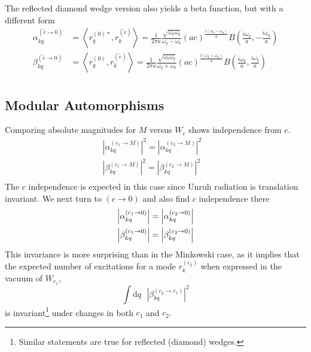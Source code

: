 \documentclass[12pt,a4paper]{article}
\newcommand{\dv}[1]{\mathrm{d} #1 \text{ }}
\begin{document}
The reflected diamond wedge version also yields a beta function, but with a different form
\begin{equation}
  \begin{aligned}
    \alpha^{(\widetilde{c} \rightarrow 0)}_{kq}     &= \left<r_q^{(0)*}, r_k^{(\widetilde{c})} \right> = \frac{1}{2 \pi a}\frac{\sqrt{\omega_k \omega_q}}{\omega_q - \omega_k} (ac)^{\frac{i(\omega_k - \omega_q)}{a}} B\left(\frac{i\omega_k}{a}, -\frac{i\omega_q}{a}\right) \\
    \beta^{(\widetilde{c} \rightarrow 0)}_{kq} &= \left<r_q^{(0)}, r_k^{(\widetilde{c})} \right> = \frac{1}{2 \pi a}\frac{\sqrt{\omega_k \omega_q}}{\omega_q + \omega_k} (ac)^{\frac{i(\omega_k + \omega_q)}{a}} B\left(\frac{i\omega_k}{a}, \frac{i\omega_q}{a}\right) \\
  \end{aligned}
  \label{bogoTC0}
\end{equation}

\subsection{Modular Automorphisms} \label{sec:mod}

Comparing absolute magnitudes for $M$ versus $W_c$ shows independence from $c$.
\begin{equation}
  \begin{array}{cc}
    \left|\alpha_{kq}^{(c_1 \rightarrow M)}\right|^2 = \left|\alpha_{kq}^{(c_2 \rightarrow M)}\right|^2 & \\
    \left|\beta_{kq}^{(c_1 \rightarrow M)}\right|^2 = \left|\beta_{kq}^{(c_2 \rightarrow M)}\right|^2 & \\
 \end{array}
\end{equation}
The $c$ independence is expected in this case since Unruh radiation is translation invariant. We next turn to $(c \rightarrow 0)$ and also find $c$ independence there 
\begin{equation}
  \begin{array}{c}
    \left|\alpha_{kq}^{(c_1 \rightarrow 0)}\right| = \left|\alpha_{kq}^{(c_2 \rightarrow 0)}\right| \vspace{4pt} \\
    \left|\beta_{kq}^{(c_1 \rightarrow 0)}\right| = \left|\beta_{kq}^{(c_2 \rightarrow 0)}\right| \\
  \end{array}
\end{equation}
This invariance is more surprising than in the Minkowski case, as it implies that the expected number of excitations for a mode $r_k^{(c_2)}$ when expressed in the vacuum of $W_{c_1}$,
\begin{equation}
  \int \dv{q} |\beta^{(c_2 \rightarrow c_1)}_{kq}|^2
\end{equation}
is invariant\footnote{Similar statements are true for reflected (diamond) wedges.} under changes in both $c_1$ and $c_2$.
\end{document}
